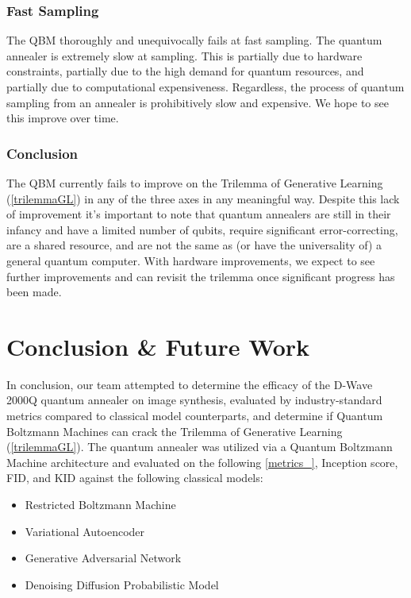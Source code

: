 \documentclass[%
 reprint,
 amsmath,amssymb,
 aps,
]{revtex4-2}
\begin{document}
\subsubsection{Fast Sampling}
The QBM thoroughly and unequivocally fails at fast sampling. The quantum annealer is extremely slow at sampling. This is partially due to hardware constraints, partially due to the high demand for quantum resources, and partially due to computational expensiveness. Regardless, the process of quantum sampling from an annealer is prohibitively slow and expensive. We hope to see this improve over time.

\subsubsection{Conclusion}
The QBM currently fails to improve on the Trilemma of Generative Learning (\ref{trilemmaGL}) in any of the three axes in any meaningful way. Despite this lack of improvement it's important to note that quantum annealers are still in their infancy and have a limited number of qubits, require significant error-correcting, are a shared resource, and are not the same as (or have the universality of) a general quantum computer. With hardware improvements, we expect to see further improvements and can revisit the trilemma once significant progress has been made.

\section{Conclusion \& Future Work}
\label{future}
In conclusion, our team attempted to determine the efficacy of the D-Wave 2000Q quantum annealer on image synthesis, evaluated by industry-standard metrics compared to classical model counterparts, and determine if Quantum Boltzmann Machines can crack the Trilemma of Generative Learning (\ref{trilemmaGL}). The quantum annealer was utilized via a Quantum Boltzmann Machine architecture and evaluated on the following \ref{metrics_}, Inception score, FID, and KID against the following classical models:
\begin{itemize}
\item Restricted Boltzmann Machine
\item Variational Autoencoder
\item Generative Adversarial Network
\item Denoising Diffusion Probabilistic Model
\end{itemize}
\end{document}
